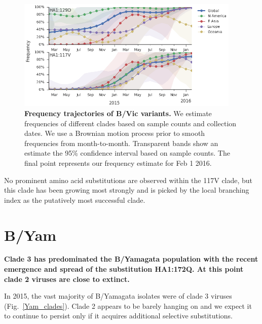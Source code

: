 \documentclass[11pt,oneside,letterpaper]{article}
\begin{document}
\begin{figure}[H]
	\centering		
	\includegraphics[width=0.95\textwidth]{../figures/feb-2016/Vic_mutations.png}
	\caption{\textbf{Frequency trajectories of B/Vic variants.}
	We estimate frequencies of different clades based on sample counts and collection dates.
	We use a Brownian motion process prior to smooth frequencies from month-to-month.
	Transparent bands show an estimate the 95\% confidence interval based on sample counts.
	The final point represents our frequency estimate for Feb 1 2016.	
	}
	\label{Vic_mutations}
\end{figure}

No prominent amino acid substitutions are observed within the 117V clade, but this clade has been growing most strongly and is picked by the local branching index \cite{neher2014predicting} as the putatively most successful clade.

\clearpage
\pagebreak

\section*{B/Yam}

\textbf{Clade 3 has predominated the B/Yamagata population with the recent emergence and spread of the substitution HA1:172Q. At this point clade 2 viruses are close to extinct.}

In 2015, the vast majority of B/Yamagata isolates were of clade 3 viruses (Fig.\ \ref{Yam_clades}). Clade 2 appears to be barely hanging on and we expect it to continue to persist only if it acquires additional selective substitutions.
\end{document}
